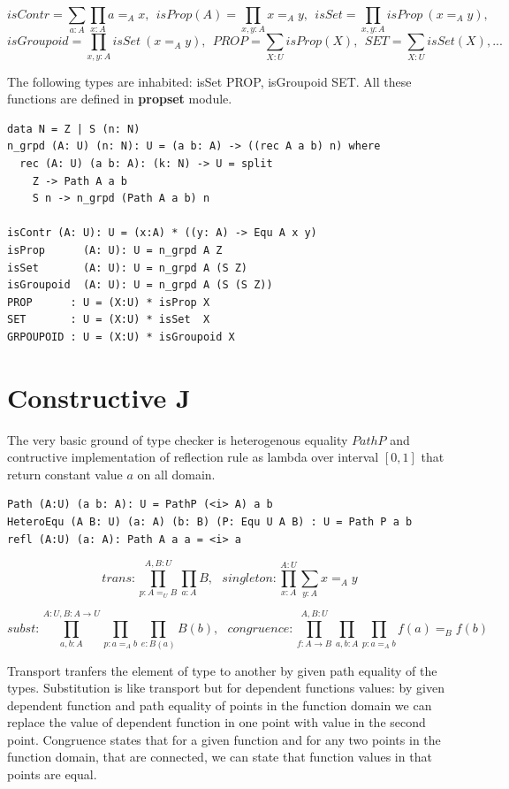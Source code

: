 \documentclass{svproc}
\begin{document}
$$isContr = \sum_{a:A}\prod_{x:A} a =_A x,\ \ 
  isProp(A) = \prod_{x,y:A} x =_A y,\ \ 
  isSet = \prod_{x,y:A} isProp\ (x =_A y),\ \ $$
$$isGroupoid = \prod_{x,y:A} isSet\ (x =_A y),\ \ 
  PROP = \sum_{X:U}isProp(X),\ \ 
  SET = \sum_{X:U}isSet(X),...$$

The following types are inhabited: isSet PROP, isGroupoid SET.
All these functions are defined in {\bf propset} module.

\begin{lstlisting}[mathescape=true]
data N = Z | S (n: N)
n_grpd (A: U) (n: N): U = (a b: A) -> ((rec A a b) n) where
  rec (A: U) (a b: A): (k: N) -> U = split
    Z -> Path A a b
    S n -> n_grpd (Path A a b) n

isContr (A: U): U = (x:A) * ((y: A) -> Equ A x y)
isProp      (A: U): U = n_grpd A Z
isSet       (A: U): U = n_grpd A (S Z)
isGroupoid  (A: U): U = n_grpd A (S (S Z))
PROP      : U = (X:U) * isProp X
SET       : U = (X:U) * isSet  X
GRPOUPOID : U = (X:U) * isGroupoid X
\end{lstlisting}

\newpage
\section{Constructive J}

The very basic ground of type checker is heterogenous equality $PathP$ and contructive
implementation of reflection rule as lambda over interval $[0,1]$ that
return constant value $a$ on all domain.

\begin{lstlisting}[mathescape=true]
Path (A:U) (a b: A): U = PathP (<i> A) a b
HeteroEqu (A B: U) (a: A) (b: B) (P: Equ U A B) : U = Path P a b
refl (A:U) (a: A): Path A a a = <i> a
\end{lstlisting}

$$trans : \prod_{p:A=_U B}^{A,B:U} \prod_{a:A} B,\ \ \ singleton : \prod_{x:A}^{A:U} \sum_{y:A} x =_A y $$

$$subst : \prod_{a,b:A}^{A:U,B:A\rightarrow U} \prod_{p: a =_A b} \prod_{e:B(a)} B(b), \ \ \ 
  congruence : \prod_{f:A\rightarrow B}^{A,B:U} \prod_{a,b:A} \prod_{p:a =_A b} f(a) =_B f(b) $$

Transport tranfers the element of type to another by given path equality of the types.
Substitution is like transport but for dependent functions values: by given dependent function
and path equality of points in the function domain we can replace the value of dependent function
in one point with value in the second point. Congruence states that for a given function
and for any two points in the function domain, that are connected, we can state that function
values in that points are equal.
\end{document}
